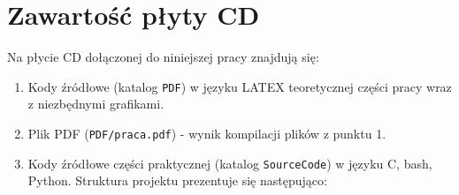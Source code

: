 \chapter{Zawartość płyty CD}
\thispagestyle{chapterBeginStyle}
\label{plytaCD}

Na płycie CD dołączonej do niniejszej pracy znajdują się:
\begin{enumerate}
	\item Kody źródłowe (katalog \verb|PDF|) w języku LATEX teoretycznej części pracy wraz z niezbędnymi grafikami.
    \item Plik PDF (\verb|PDF/praca.pdf|) - wynik kompilacji plików z punktu 1.
	\item Kody źródłowe części praktycznej (katalog \verb|SourceCode|) w języku C, bash, Python. Struktura projektu prezentuje się następująco:
	
\end{enumerate}



